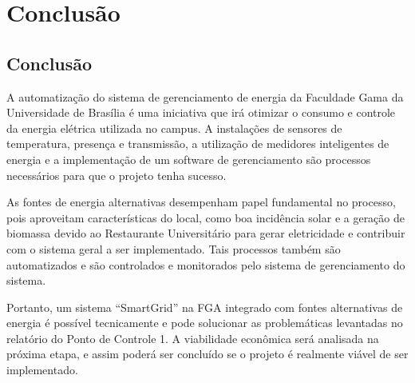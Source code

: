 \part{Conclusão}
\chapter[Conclusão]{Conclusão}
A automatização do sistema de gerenciamento de energia da Faculdade Gama da Universidade de Brasília é uma iniciativa que irá otimizar o consumo e controle da energia elétrica utilizada no campus. A instalações de sensores de temperatura, presença e transmissão, a utilização de medidores inteligentes de energia e a implementação de um software de gerenciamento são processos necessários para que o projeto tenha sucesso.

As fontes de energia alternativas desempenham papel fundamental no processo, pois aproveitam características do local, como boa incidência solar e a geração de biomassa devido ao Restaurante Universitário para gerar eletricidade e contribuir com o sistema geral a ser implementado. Tais processos também são automatizados e são controlados e monitorados pelo sistema de gerenciamento do sistema. 

Portanto, um sistema ``SmartGrid'' na FGA integrado com fontes alternativas de energia é possível tecnicamente e pode solucionar as problemáticas levantadas no relatório do Ponto de Controle 1. A viabilidade econômica será analisada na próxima etapa, e assim poderá ser concluído se o projeto é realmente viável de ser implementado.
